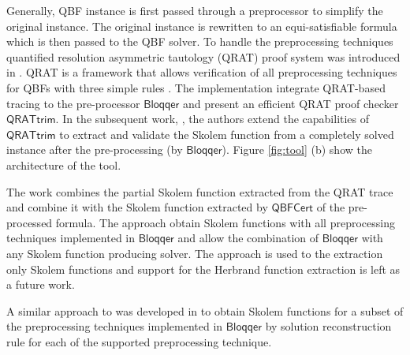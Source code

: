 \documentclass[runningheads]{llncs}
\newcommand{\qtrim}{\mathsf{QRATtrim}}
\newcommand{\bloqqer}{\mathsf{Bloqqer}}
\newcommand{\cheskol}{\mathsf{cheskol}}
\newcommand{\0}{0}
\newcommand{\1}{1}
\def\qcert{\mathsf{QBFCert}}
\begin{document}
Generally, QBF instance is first passed through a preprocessor to simplify the original instance. The original instance is rewritten to an equi-satisfiable formula which is then passed to the QBF solver. To handle the preprocessing techniques quantified resolution asymmetric tautology (QRAT) proof system was introduced in \cite{HeuleSB14a}. QRAT is a framework that allows verification of all preprocessing techniques for QBFs with three simple rules \cite{HeuleSB14a}. The implementation integrate QRAT-based tracing to the pre-processor $\bloqqer$ \cite{Biere2011} and present an efficient QRAT proof checker $\qtrim$.
In the subsequent work, \cite{HeuleSB14}, the authors extend the capabilities of $\qtrim$ to extract and validate the Skolem function from a completely solved instance after the pre-processing (by $\bloqqer$). 
Figure \ref{fig:tool} (b) show the architecture of the tool.


The work \cite{FazekasHSB17} combines the partial Skolem function extracted from the QRAT trace and combine it with the Skolem function extracted by $\qcert$ of the pre-processed formula. The approach obtain Skolem functions with
all preprocessing techniques implemented in  $\bloqqer$ and allow the combination of $\bloqqer$ with any Skolem function producing solver. The approach is used to the extraction only Skolem functions and support for the Herbrand function extraction is left as a future work.

A similar approach to  \cite{FazekasHSB17} was developed in \cite{JanotaGM13} to obtain Skolem functions for a subset of the preprocessing techniques implemented in $\bloqqer$ by solution reconstruction rule for each of the supported preprocessing technique.
\end{document}
